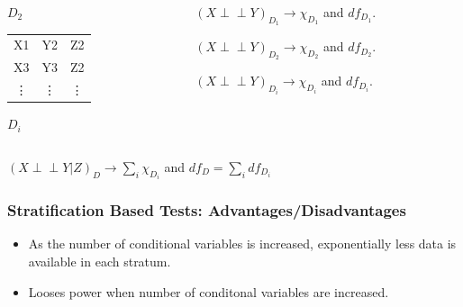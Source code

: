 \documentclass{beamer}
\def\ci{\perp\!\!\!\!\!\perp}
\begin{document}
\begin{frame}
\begin{block}{}
\begin{columns}
\begin{column}{0.25 \textwidth}
\begin{block}{\centering $ D_2 $}
\begin{tabular}{c c c}
					\hline
					X1 & Y2 & Z2 \\
					X3 & Y3 & Z2 \\
					\vdots & \vdots & \vdots \\
				\end{tabular}
			\end{block}
			\begin{block}{\centering $ D_i $}
			\end{block}
		\end{column}
		\begin{column}{0.5 \textwidth}
			\begin{block}{}
				$(X \ci Y)_{D_1} \to \chi_{D_1} $ and $ df_{D_1} $.
			\end{block}
			\begin{block}{}
				$(X \ci Y)_{D_2} \to \chi_{D_2} $ and $ df_{D_2} $.
			\end{block}
			\begin{block}{}
				$(X \ci Y)_{D_i} \to \chi_{D_i} $ and $ df_{D_i} $.
			\end{block}
		\end{column}
	\end{columns}
	\end{block}
	\begin{block}{}
		\centering
		$ (X \ci Y | Z)_{D} \to \sum_i \chi_{D_i} $ and $ df_{D} = \sum_i df_{D_i} $
	\end{block}
\end{frame}

\begin{frame}
	\frametitle{Stratification Based Tests: Advantages/Disadvantages}
	\begin{itemize}
		\item As the number of conditional variables is increased, exponentially
			less data is available in each stratum.
		\item Looses power when number of conditonal variables
			are increased.
	\end{itemize}
\end{frame}
\end{document}
